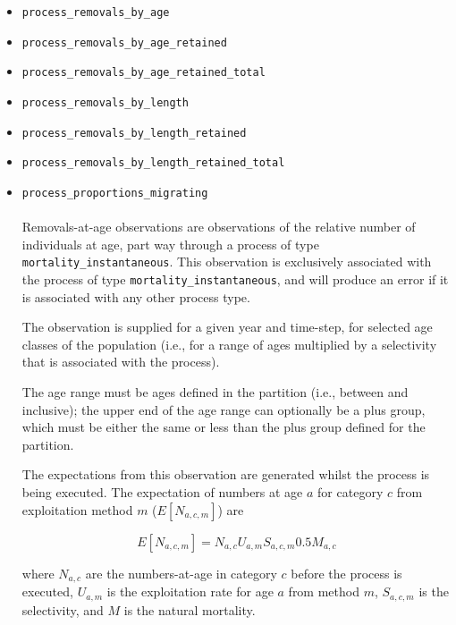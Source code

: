 \ifAgeBased
\begin{itemize}
	\item \texttt{process\_removals\_by\_age}
	\item \texttt{process\_removals\_by\_age\_retained}
	\item \texttt{process\_removals\_by\_age\_retained\_total}
	\item \texttt{process\_removals\_by\_length}
	\item \texttt{process\_removals\_by\_length\_retained}
	\item \texttt{process\_removals\_by\_length\_retained\_total}
	\item \texttt{process\_proportions\_migrating}
	
	\paragraph*{\label{sec:removals-by-age}}\label{sec:Observation-ProcessRemovalsByAge}
	
	Removals-at-age observations are observations of the relative number of individuals at age, part way through a process of type \texttt{mortality\_instantaneous}. This observation is exclusively associated with the process of type \texttt{mortality\_instantaneous}, and will produce an error if it is associated with any other process type.
	
	The observation is supplied for a given year and time-step, for selected age classes of the population (i.e., for a range of ages multiplied by a selectivity that is associated with the process).
	
	The age range must be ages defined in the partition (i.e., between  and  inclusive); the upper end of the age range can optionally be a plus group, which must be either the same or less than the plus group defined for the partition.
	
	The expectations from this observation are generated whilst the process is being executed. The expectation of numbers at age $a$ for category $c$ from exploitation method $m$ ($E[N_{a,c,m}]$) are
	
	\begin{equation}
	E[N_{a,c,m}] = N_{a,c} U_{a,m} S_{a,c,m} 0.5 M_{a,c}
	\end{equation}
	
	where $N_{a,c}$ are the numbers-at-age in category $c$ before the process is executed, $U_{a,m}$ is the exploitation rate for age $a$ from method $m$, $S_{a,c,m}$ is the selectivity, and $M$ is the natural mortality.
	

\end{itemize}
